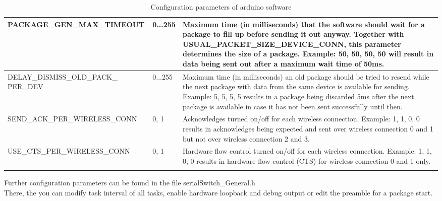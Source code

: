 \begin{center}
\begin{longtable}{p{6cm}p{1cm}p{7cm}}
            PACKAGE\_GEN\_MAX\_TIMEOUT  &  0...255 & 
            Maximum time (in milliseconds) that the software should wait for a package to fill up before sending it out anyway. Together with USUAL\_PACKET\_SIZE\_DEVICE\_CONN, this parameter determines the size of a package. Example: {50, 50, 50, 50} will result in data being sent out after a maximum wait time of 50ms.\\
            \hline
            DELAY\_DISMISS\_OLD\_PACK\_ PER\_DEV &  0...255 & 
            Maximum time (in milliseconds) an old package should be tried to resend while the next package with data from the same device is available for sending. Example: {5, 5, 5, 5} results in a package being discarded 5ms after the next package is available in case it has not been sent successfully until then.\\
            \hline
            SEND\_ACK\_PER\_WIRELESS\_CONN &  0, 1 & 
            Acknowledges turned on/off for each wireless connection. Example: {1, 1, 0, 0} results in acknowledges being expected and sent over wireless connection 0 and 1 but not over wireless connection 2 and 3.\\
            \hline
            USE\_CTS\_PER\_WIRELESS\_CONN &  0, 1 & 
            Hardware flow control turned on/off for each wireless connection. Example: {1, 1, 0, 0} results in hardware flow control (CTS) for wireless connection 0 and 1 only.\\
            \hline
    \caption{Configuration parameters of arduino software}
    \label{tab:tabConfigArduinoSw}    
    \end{longtable}
\end{center}
%
Further configuration parameters can be found in the file serialSwitch\_General.h\\
There, the you can modify task interval of all tasks, enable hardware loopback and debug output or edit the preamble for a package start.
%
